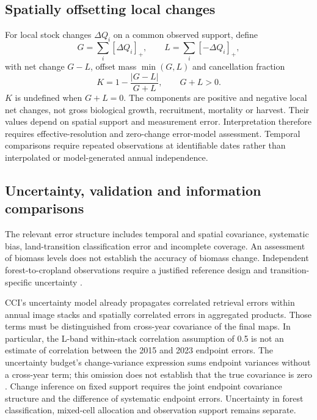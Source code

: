 \documentclass[11pt,a4paper]{article}
\begin{document}
\subsection{Spatially offsetting local changes}
For local stock changes $\Delta Q_i$ on a common observed support, define
\[
G=\sum_i[\Delta Q_i]_+,\qquad L=\sum_i[-\Delta Q_i]_+,
\]
with net change $G-L$, offset mass $\min(G,L)$ and cancellation fraction
\begin{equation}
K=1-\frac{|G-L|}{G+L},\qquad G+L>0.\label{eq:cancel}
\end{equation}
$K$ is undefined when $G+L=0$. The components are positive and negative local net changes, not gross biological growth, recruitment, mortality or harvest. Their values depend on spatial support and measurement error. Interpretation therefore requires effective-resolution and zero-change error-model assessment. Temporal comparisons require repeated observations at identifiable dates rather than interpolated or model-generated annual independence.



\subsection{Uncertainty, validation and information comparisons}
The relevant error structure includes temporal and spatial covariance, systematic bias, land-transition classification error and incomplete coverage. An assessment of biomass levels does not establish the accuracy of biomass change. Independent forest-to-cropland observations require a justified reference design and transition-specific uncertainty \citep{Olofsson2014}.

CCI's uncertainty model already propagates correlated retrieval errors within annual image stacks and spatially correlated errors in aggregated products. Those terms must be distinguished from cross-year covariance of the final maps. In particular, the L-band within-stack correlation assumption of 0.5 is not an estimate of correlation between the 2015 and 2023 endpoint errors. The uncertainty budget's change-variance expression sums endpoint variances without a cross-year term; this omission does not establish that the true covariance is zero \citep[pp.~14--22, 23--28]{E3UB2025}. Change inference on fixed support requires the joint endpoint covariance structure and the difference of systematic endpoint errors. Uncertainty in forest classification, mixed-cell allocation and observation support remains separate.
\end{document}
